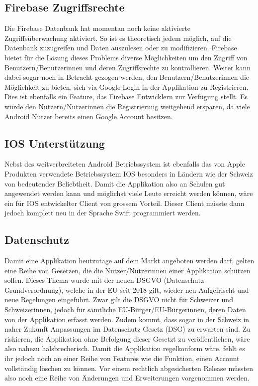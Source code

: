 \documentclass[a4paper,11pt]{report}
\begin{document}
		\subsection*{Firebase Zugriffsrechte}
		Die Firebase Datenbank hat momentan noch keine aktivierte Zugriffsüberwachung aktiviert. So ist es theoretisch jedem möglich, auf die Datenbank zuzugreifen und Daten auszulesen oder zu modifizieren. Firebase bietet für die Lösung dieses Problems diverse Möglichkeiten um den Zugriff von Benutzern/Benutzerinnen und deren Zugriffsrechte zu kontrollieren. Weiter kann dabei sogar noch in Betracht gezogen werden, den Benutzern/Benutzerinnen die Möglichkeit zu bieten, sich via Google Login in der Applikation zu Registrieren. Dies ist ebenfalls ein Feature, das Firebase Entwicklern zur Verfügung stellt. Es würde den Nutzern/Nutzerinnen die Registrierung weitgehend ersparen, da viele Android Nutzer bereits einen Google Account besitzen.
		
		\subsection*{IOS Unterstützung}
		Nebst des weitverbreiteten Android Betriebssystem ist ebenfalls das von Apple Produkten verwendete Betriebssystem IOS besonders in Ländern wie der Schweiz von bedeutender Beliebtheit. Damit die Applikation also an Schulen gut angewendet werden kann und möglichst viele Leute erreicht werden können, wäre ein für IOS entwickelter Client von grossem Vorteil. Dieser Client müsste dann jedoch komplett neu in der Sprache Swift programmiert werden.
		
		\subsection*{Datenschutz}
		Damit eine Applikation heutzutage auf dem Markt angeboten werden darf, gelten eine Reihe von Gesetzen, die die Nutzer/Nutzerinnen einer Applikation schützen sollen.  Dieses Thema wurde mit der neuen DSGVO (Datenschutz Grundverordnung), welche in der EU seit 2018 gilt,  wieder neu Aufgefrischt und neue Regelungen eingeführt. Zwar gilt die DSGVO nicht für Schweizer und Schweizerinnen, jedoch für sämtliche EU-Bürger/EU-Bürgerinnen, deren Daten von der Applikation erfasst werden. Zudem kommt, dass sogar in der Schweiz in naher Zukunft Anpassungen im Datenschutz Gesetz (DSG) zu erwarten sind. Zu riskieren, die Applikation ohne Befolgung dieser Gesetzt zu veröffentlichen, wäre also nahezu halsbrecherisch. Damit die Applikation regelkonform wäre, fehlt es ihr jedoch noch an einer Reihe von Features wie die Funktion, einen Account vollständig löschen zu können. Vor einem rechtlich abgesicherten Release müssten also noch eine Reihe von Änderungen und Erweiterungen vorgenommen werden.
		
\end{document}
